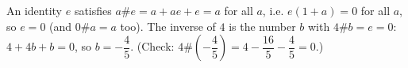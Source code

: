 An identity $e$ satisfies $a\#e=a+ae+e=a$ for all $a$, i.e. $e(1+a)=0$ for all $a$, so $e=0$ (and $0\#a=a$ too). The inverse of $4$ is the number $b$ with $4\#b=e=0$: $4+4b+b=0$, so $b=\boxed{-\dfrac{4}{5}}$. (Check: $4\#\left(-\dfrac{4}{5}\right)=4-\dfrac{16}{5}-\dfrac{4}{5}=0$.)
